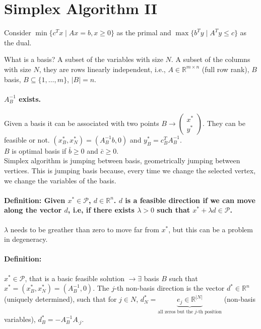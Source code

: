 \documentclass[main]{subfiles}
\begin{document}

\section{Simplex Algorithm II}

Consider $\min \{c^T x\mid Ax = b, x\geq 0\}$ as the primal and $\max \{b^T y
\mid A^T y \leq c\}$ as the dual.

What is a basis? A subset of the variables with size $N$.
A subset of the columns with size $N$, they are rows linearly independent, i.e.,
$A \in \mathbb{R}^{m \times n}$ (full row rank), $B$ basis, $B \subseteq \{1,
\dots, m\}$, $|B| = n$.

\paragraph{$A^{-1}_B$ exists.}
Given a basis it can be associated with two points $B \rightarrow
\begin{pmatrix}
x^*\\
y^*
\end{pmatrix}$.
They can be feasible or not. $(x^*_B, x^*_N) = (A^{-1}_B b, 0)$ and
$y^*_B = c^T_B A^{-1}_B$.\\

$B$ is optimal basis if $\bar{b}\geq 0$ and $\bar{c} \geq 0$.\\

Simplex algorithm is jumping between basis, geometrically jumping between
vertices. This is jumping basis because, every time we change the selected
vertex, we change the variables of the basis.

\paragraph{Definition: Given $x^* \in \mathcal{P}$, $d \in \mathbb{R}^n$.
$d$ is a feasible direction if we can move along the vector $d$, i.e, if there
exists $\lambda > 0$ such that $x^* + \lambda d \in \mathcal{P}$.}
$\lambda$ needs to be greather than zero to move far from $x^*$, but this can
be a problem in degeneracy.

\paragraph{Definition:}
$x^* \in \mathcal{P}$, that is a basic feasible solution $\rightarrow \exists$
basis $B$ such that $x^* = (x^*_B, x^*_N) = (A^{-1}_B, 0)$.
The $j$-th non-basis direction is the vector $d^* \in \mathbb{R}^n$ (uniquely
determined), such that for $j \in N$, $d^*_N = \underbrace{e_j \in 
\mathbb{R}^{|N|}}_{\text{all zeros but the $j$-th position}}$ (non-basis
variables), $d^*_B = -A^{-1}_B A_{\cdot j}$.
\end{document}
